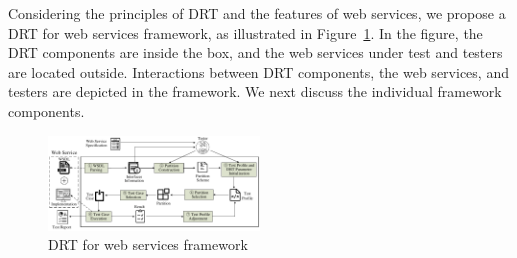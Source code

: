 \documentclass[10pt,journal,compsoc]{IEEEtran}
\begin{document}
Considering the principles of DRT and the features of web services, we propose a DRT for web services framework, as illustrated in Figure~\ref{fig:frame}.
In the figure, the DRT components are inside the box, and the web services under test and testers are located outside.
Interactions between DRT components, the web services, and testers are depicted in the framework.
We next discuss the individual framework components.

\begin{figure}[]
  \centering
  \includegraphics[width = 0.5\textwidth]{fig//framework.pdf}
  \caption{DRT for web services framework}
  \label{fig:frame}
\end{figure}
\end{document}

